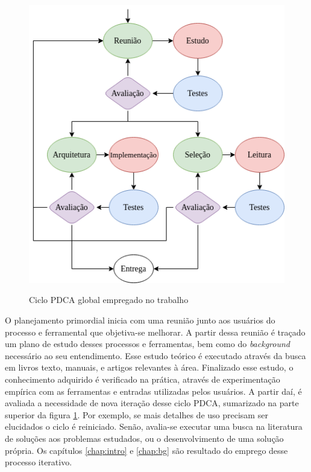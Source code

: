 \documentclass[cic,tc]{iiufrgs}
\begin{document}
\begin{figure}[H] \caption{Ciclo PDCA global empregado no trabalho} \begin{center}
\includegraphics[width=0.75\linewidth]{img/pdca_global.png} \end{center}
 \label{fig:pdca_global} \end{figure}

O planejamento primordial inicia com uma reunião junto aos usuários do processo
e ferramental que objetiva-se melhorar. A partir dessa reunião é traçado um
plano de estudo desses processos e ferramentas, bem como do \textit{background}
necessário ao seu entendimento. Esse estudo teórico é executado através da
busca em livros texto, manuais, e artigos relevantes à área. Finalizado esse
estudo, o conhecimento adquirido é verificado na prática, através de
experimentação empírica com as ferramentas e entradas utilizadas pelos
usuários. A partir daí, é avaliada a necessidade de nova iteração desse ciclo
PDCA, sumarizado na parte superior da figura \ref{fig:pdca_global}. Por exemplo,
se mais detalhes de uso precisam ser elucidados o ciclo é reiniciado. Senão,
avalia-se executar uma busca na literatura de soluções aos problemas estudados,
ou o desenvolvimento de uma solução própria. Os capítulos \ref{chap:intro} e
\ref{chap:bg} são resultado do emprego desse processo iterativo.  
\end{document}
